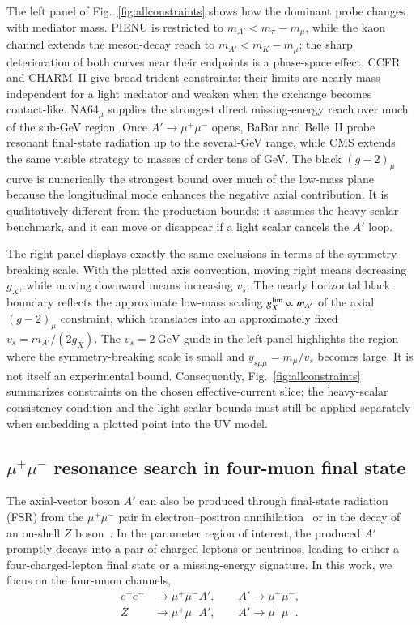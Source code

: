 \documentclass[onecolumn, aps, nofootinbib, prd, preprint, floats, floatfix, amsmath, amssymb, superscriptaddress, preprintnumbers]{revtex4-2}
\begin{document}
The left panel of Fig.~\ref{fig:allconstraints} shows how the dominant probe changes with mediator mass. PIENU is restricted to $m_{A'}<m_\pi-m_\mu$, while the kaon channel extends the meson-decay reach to $m_{A'}<m_K-m_\mu$; the sharp deterioration of both curves near their endpoints is a phase-space effect. CCFR and CHARM~II give broad trident constraints: their limits are nearly mass independent for a light mediator and weaken when the exchange becomes contact-like. NA64$_\mu$ supplies the strongest direct missing-energy reach over much of the sub-GeV region. Once $A'\to\mu^+\mu^-$ opens, BaBar and Belle~II probe resonant final-state radiation up to the several-GeV range, while CMS extends the same visible strategy to masses of order tens of GeV. The black $(g-2)_\mu$ curve is numerically the strongest bound over much of the low-mass plane because the longitudinal mode enhances the negative axial contribution. It is qualitatively different from the production bounds: it assumes the heavy-scalar benchmark, and it can move or disappear if a light scalar cancels the $A'$ loop.

The right panel displays exactly the same exclusions in terms of the symmetry-breaking scale. With the plotted axis convention, moving right means decreasing $g_X$, while moving downward means increasing $v_s$. The nearly horizontal black boundary reflects the approximate low-mass scaling $g_X^{\rm lim}\propto m_{A'}$ of the axial $(g-2)_\mu$ constraint, which translates into an approximately fixed $v_s=m_{A'}/(2g_X)$. The $v_s=2~\mathrm{GeV}$ guide in the left panel highlights the region where the symmetry-breaking scale is small and $y_{s\mu\mu}=m_\mu/v_s$ becomes large. It is not itself an experimental bound. Consequently, Fig.~\ref{fig:allconstraints} summarizes constraints on the chosen effective-current slice; the heavy-scalar consistency condition and the light-scalar bounds must still be applied separately when embedding a plotted point into the UV model.

\subsection{$\mu^+\mu^-$ resonance search in four-muon final state}

The axial-vector boson $A'$ can also be produced through final-state radiation (FSR) from the $\mu^+\mu^-$ pair in electron--positron annihilation~\cite{BaBar:2016sci, Belle-II:2022yaw, Belle-II:2024wtd} or in the decay of an on-shell $Z$ boson~\cite{Harigaya:2013twa, delAguila:2014soa, CMS:2018yxg}. In the parameter region of interest, the produced $A'$ promptly decays into a pair of charged leptons or neutrinos, leading to either a four-charged-lepton final state or a missing-energy signature. In this work, we focus on the four-muon channels,
\begin{equation}
	\begin{aligned}
		e^+e^- &\rightarrow \mu^+\mu^-A', \qquad A'\rightarrow \mu^+\mu^-,\\
		Z &\rightarrow \mu^+\mu^-A', \qquad A'\rightarrow \mu^+\mu^-.
	\end{aligned}
\end{equation}
\end{document}
